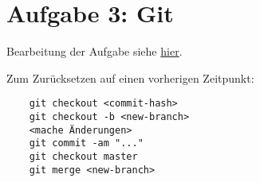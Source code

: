 \documentclass[11pt,a4paper]{scrartcl}
\begin{document}
\section{Aufgabe 3: Git}
Bearbeitung der Aufgabe siehe \href{}{hier}. \par\noindent
Zum Zurücksetzen auf einen vorherigen Zeitpunkt:
\begin{verbatim}
    git checkout <commit-hash>
    git checkout -b <new-branch>
    <mache Änderungen>
    git commit -am "..."
    git checkout master
    git merge <new-branch>
\end{verbatim}

\printbibliography[title=Literaturverzeichnis]
\end{document}
